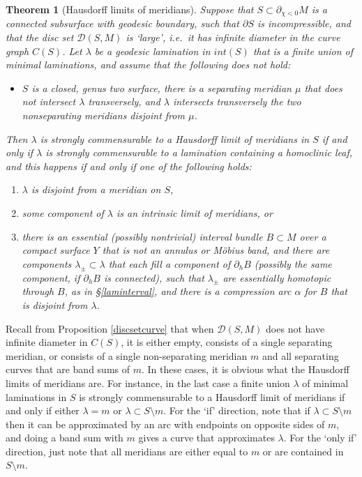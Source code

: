 \documentclass[12pt]{amsart}
\newtheorem{theorem}{Theorem}[section] \newtheorem{philosophy}{Statement}[theorem]
\theoremstyle{definition}
\theoremstyle{remark}
\begin{document}
\begin{theorem}[Hausdorff limits of meridians]\label{hlimits}
Suppose that $S \subset \partial_{\chi<0} M$ is a connected subsurface with geodesic boundary, such that $\partial S$ is  incompressible, and that the disc set $\mathcal D(S,M)$ is `large', i.e.\ it has infinite diameter in the curve graph $C(S)$.  Let $\lambda$ be a geodesic lamination in $int(S)$ that is a finite union of minimal laminations, and assume that the following does \emph{not} hold:
\begin{itemize}
\item[$(\star)$] $S$ is a closed, genus two surface,  there is a separating meridian $\mu$ that does not intersect $\lambda$ transversely, and $\lambda$ intersects transversely the two nonseparating meridians disjoint from $\mu$.
\end{itemize} Then $\lambda$ is strongly commensurable to a Hausdorff limit of meridians in $S$ if and only if $\lambda$ is strongly commensurable to a lamination containing a homoclinic leaf, and this happens if and only if one of the following holds:
\begin{enumerate}
\item $\lambda$ is disjoint from a meridian on $S$,
\item some component of $\lambda $ is an intrinsic limit of meridians, or
\item there is an essential (possibly nontrivial) interval bundle $B \subset M$ over a compact surface $Y$ that is not an annulus or M\"obius band, and there are components $\lambda_\pm \subset \lambda$ that each fill a component of $\partial_h B$ (possibly the same component, if $\partial_h B$ is connected), such that $\lambda_\pm$ are essentially homotopic through $B$, as in \S \ref{laminterval}, and there is a compression arc $\alpha$ for $B$ that is disjoint from $\lambda $.
\end{enumerate}
\end{theorem}


Recall from Proposition \ref{discsetcurve} that when $\mathcal D(S,M)$ does not have infinite diameter in $C(S)$, it is either empty, consists of a single separating meridian, or consists of a single non-separating meridian $m$ and all separating curves that are band sums of $m$. In these cases, it is obvious what the Hausdorff limits of meridians are. For instance, in the last case a finite union $\lambda$ of minimal laminations in $S$ is strongly commensurable to a Hausdorff limit of meridians if and only if either $\lambda=m$ or $\lambda \subset S \setminus m$. For the `if'  direction, note that if $\lambda \subset S \setminus m$ then it can be approximated by an arc with endpoints on opposite sides of $m$, and doing a band sum with $m$ gives a curve that approximates $\lambda$. For the `only if' direction, just note that all meridians are either equal to $m$ or are contained in $S \setminus m$.
\end{document}
